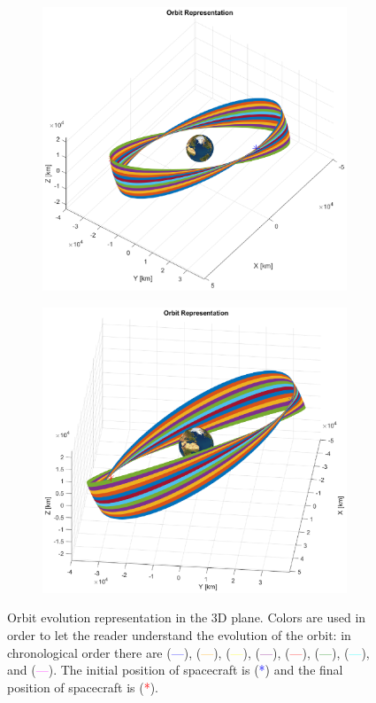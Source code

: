 \documentclass{article}
\newcommand{\reddashedline}{\textcolor{red}{---}}
\newcommand{\orangedashedline}{\textcolor{orange}{---}}
\newcommand{\yellowdashedline}{\textcolor{yellow}{---}}
\newcommand{\greendashedline}{\textcolor{green}{---}}
\newcommand{\bluedashedline}{\textcolor{blue}{---}}
\newcommand{\purpledashedline}{\textcolor{purple}{---}}
\newcommand{\cyandashedline}{\textcolor{cyan}{---}}
\newcommand{\magentadashedline}{\textcolor{magenta}{---}}
\begin{document}
\begin{figure}[H]
	\centering
	\begin{subfigure}[b]{0.5\textwidth}
		\includegraphics[width=\textwidth]{evolutionorbit2.eps}
		\caption{}
		\label{fig:1a}
	\end{subfigure}%
	\begin{subfigure}[b]{0.5\textwidth}
		\includegraphics[width=\textwidth]{evolutionorbit3.eps}
		\caption{}
		\label{fig:1b}
	\end{subfigure}
	\caption{Orbit evolution representation in the 3D plane. Colors are used in order to let the reader understand the evolution of the orbit: in chronological order there are (\bluedashedline), (\orangedashedline), (\yellowdashedline), (\purpledashedline), (\reddashedline), (\greendashedline), (\cyandashedline), and (\magentadashedline). The initial position of spacecraft is (\textcolor{blue}{*}) and the final position of spacecraft is (\textcolor{red}{*}).
	}
\end{figure}
\end{document}
